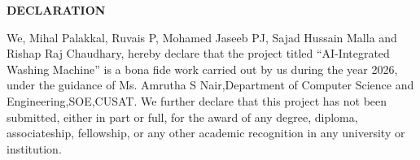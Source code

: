 \clearpage
{}
{}
\thispagestyle{footeronly}
\begin{center}
{\Large \textbf{DECLARATION}}
\end{center}

\justifying
\noindent
We, Mihal Palakkal, Ruvais P, Mohamed Jaseeb PJ, 
Sajad Hussain Malla and Rishap Raj Chaudhary, hereby declare that the project titled 
{``AI-Integrated Washing Machine''} 
is a bona fide work carried out by us during the year 2026, 
under the guidance of {Ms. Amrutha S Nair},Department of Computer Science and Engineering,SOE,CUSAT. 
We further declare that this project has not been submitted, 
either in part or full, for the award of any degree, diploma, 
associateship, fellowship, or any other academic recognition 
in any university or institution.

\vfill

\clearpage